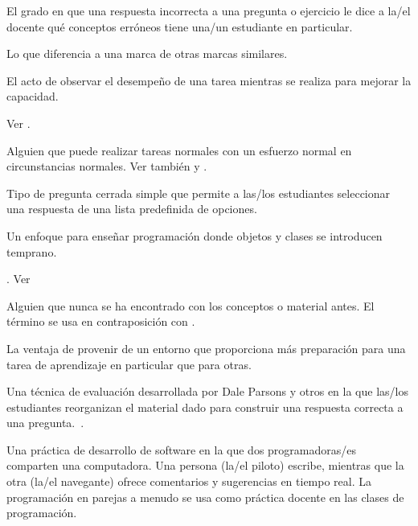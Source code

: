 \begin{description}
 El grado en que una respuesta incorrecta
a una pregunta o ejercicio le dice a la/el docente qué conceptos erróneos tiene una/un estudiante en particular.

 Lo que diferencia a una marca de otras
marcas similares.

 El acto de observar el desempeño
de una tarea mientras se realiza para mejorar la capacidad.

Ver .

 Alguien que puede
realizar tareas normales con un esfuerzo normal en circunstancias normales. Ver también
 y .

 Tipo de pregunta cerrada simple que permite 
a las/los estudiantes seleccionar una respuesta de una lista predefinida de opciones.

 Un enfoque para enseñar programación donde
objetos y clases se introducen temprano.

. Ver 

 Alguien que nunca se ha
encontrado con los conceptos o material antes. El término se usa en contraposición con
.

 La ventaja de provenir de un entorno que proporciona más 
preparación para una tarea de aprendizaje en particular que para otras.

 Una técnica de evaluación desarrollada
por Dale Parsons y otros en la que las/los estudiantes reorganizan el material dado
para construir una respuesta correcta a una pregunta.~\cite{Pars2006}.

 Una práctica de desarrollo de software en la que 
dos programadoras/es comparten una computadora. Una persona (la/el piloto) escribe, mientras que la otra 
(la/el navegante) ofrece comentarios y sugerencias en tiempo real. 
La programación en parejas a menudo se usa como práctica docente en las clases de programación.


\end{description}
